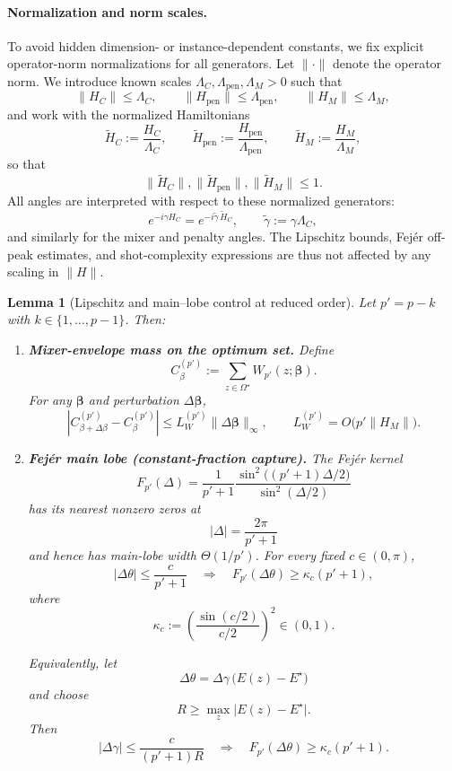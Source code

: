 \documentclass[a4paper,unpublished,onecolumn,11pt]{quantumarticle}
\newtheorem{lemma}[theorem]{Lemma}
\theoremstyle{definition}
\theoremstyle{remark}
\begin{document}
\paragraph{Normalization and norm scales.}
To avoid hidden dimension- or instance-dependent constants, we fix
explicit operator-norm normalizations for all generators. Let
\(\|\cdot\|\) denote the operator norm. We introduce known scales
\(\Lambda_C,\Lambda_{\mathrm{pen}},\Lambda_M>0\) such that
\[
\|H_C\|\le \Lambda_C,
\qquad
\|H_{\mathrm{pen}}\|\le \Lambda_{\mathrm{pen}},
\qquad
\|H_M\|\le \Lambda_M,
\]
and work with the normalized Hamiltonians
\[
\widetilde H_C
:=
\frac{H_C}{\Lambda_C},
\qquad
\widetilde H_{\mathrm{pen}}
:=
\frac{H_{\mathrm{pen}}}{\Lambda_{\mathrm{pen}}},
\qquad
\widetilde H_M
:=
\frac{H_M}{\Lambda_M},
\]
so that
\[
\|\widetilde H_C\|,
\|\widetilde H_{\mathrm{pen}}\|,
\|\widetilde H_M\|
\le 1.
\]
All angles are interpreted with respect to these normalized generators:
\[
e^{-i\gamma H_C}
=
e^{-i\widetilde\gamma\,\widetilde H_C},
\qquad
\widetilde\gamma
:=
\gamma\Lambda_C,
\]
and similarly for the mixer and penalty angles. The Lipschitz bounds, Fej\'er off-peak estimates, and shot-complexity
expressions are thus not affected by any scaling in \(\|H\|\).

\begin{lemma}[Lipschitz and main--lobe control at reduced order]
\label{lem:lip-reduced}
Let \(p'=p-k\) with \(k\in\{1,\dots,p-1\}\). Then:
\begin{enumerate}[leftmargin=1.5em]

\item \textbf{Mixer-envelope mass on the optimum set.}
Define
\[
C_{\beta}^{(p')}
:=
\sum_{z\in\Omega^\star}
W_{p'}(z;\boldsymbol\beta).
\]
For any \(\boldsymbol\beta\) and perturbation
\(\Delta\boldsymbol\beta\),
\[
\left|
C_{\beta+\Delta\beta}^{(p')}
-
C_{\beta}^{(p')}
\right|
\le
L_W^{(p')}
\|\Delta\boldsymbol\beta\|_\infty,
\qquad
L_W^{(p')}
=
O\!\bigl(p'\|H_M\|\bigr).
\]

\item \textbf{Fej\'er main lobe (constant-fraction capture).}
The Fej\'er kernel
\[
F_{p'}(\Delta)
=
\frac{1}{p'+1}
\frac{
\sin^2\!\bigl((p'+1)\Delta/2\bigr)
}{
\sin^2(\Delta/2)
}
\]
has its nearest nonzero zeros at
\[
|\Delta|
=
\frac{2\pi}{p'+1}
\]
and hence has main-lobe width \(\Theta(1/p')\). For every fixed
\(c\in(0,\pi)\),
\[
|\Delta\theta|
\le
\frac{c}{p'+1}
\quad\Longrightarrow\quad
F_{p'}(\Delta\theta)
\ge
\kappa_c(p'+1),
\]
where
\[
\kappa_c
:=
\left(
\frac{\sin(c/2)}{c/2}
\right)^2
\in(0,1).
\]

Equivalently, let
\[
\Delta\theta
=
\Delta\gamma\,
\bigl(E(z)-E^\star\bigr)
\]
and choose
\[
R
\ge
\max_z
\bigl|E(z)-E^\star\bigr|.
\]
Then
\[
|\Delta\gamma|
\le
\frac{c}{(p'+1)R}
\quad\Longrightarrow\quad
F_{p'}(\Delta\theta)
\ge
\kappa_c(p'+1).
\]

\end{enumerate}
\end{lemma}
\end{document}
